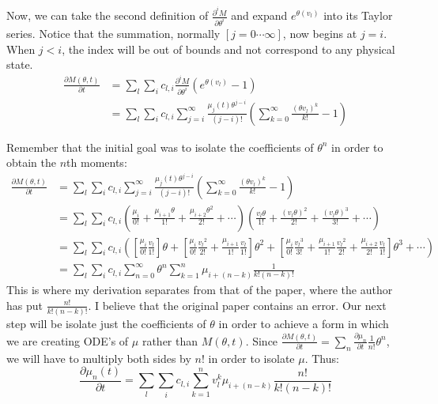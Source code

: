 \documentclass[a4paper,10pt]{article}
\begin{document}
Now, we can take the second definition of $\frac{\partial ^i M}{\partial \theta^i}$ and expand $e^{\theta (v_l)}$ into its Taylor series. Notice that the summation, normally $\left[j=0\cdots \infty\right]$, now begins at $j=i$. When $j<i$, the index will be out of bounds and not correspond to any physical state.
\begin{align*}
 \frac{\partial M(\theta, t)}{\partial t} &= \sum_l \sum_i c_{l,i} \frac{\partial ^i M}{\partial \theta^i} \left(e^{\theta (v_l)}-1\right)\\
 &= \sum_l \sum_i c_{l,i} \sum_{j=i}^\infty \frac{\mu_j(t)\theta^{j-i}}{(j-i)!}\left(\sum_{k=0}^\infty \frac{{(\theta v_l)}^k}{k!}-1\right)
\end{align*}

Remember that the initial goal was to isolate the coefficients of $\theta^n$ in order to obtain the $n$th moments:
\begin{align*}
 \frac{\partial M(\theta, t)}{\partial t} &= \sum_l \sum_i c_{l,i} \sum_{j=i}^\infty \frac{\mu_j(t)\theta^{j-i}}{(j-i)!} \left( \sum_{k=0}^\infty \frac{{(\theta v_l)}^k}{k!}-1 \right)\\
&= \sum_l \sum_i c_{l,i} \left( \frac{\mu_i}{0!}+\frac{\mu_{i+1}\theta}{1!}+\frac{\mu_{i+2}\theta^2}{2!}+\cdots \right) \left(\frac{v_l \theta}{1!}+\frac{{(v_l \theta)}^2}{2!}+\frac{{(v_l \theta)}^3}{3!}+\cdots\right)\\
 &= \sum_l \sum_i c_{l,i} \left( \left[\frac{\mu_i}{0!}\frac{v_l}{1!}\right]\theta+\left[\frac{\mu_{i}}{0!}\frac{{v_l}^2}{2!}+\frac{\mu_{i+1}}{1!}\frac{{v_l}}{1!}\right]\theta^2+\left[\frac{\mu_{i}}{0!}\frac{{v_l}^3}{3!}+\frac{\mu_{i+1}}{1!}\frac{{v_l}^2}{2!}+\frac{\mu_{i+2}}{2!}\frac{{v_l}}{1!}\right]\theta^3+\cdots\right)\\
  &=\sum_l \sum_i c_{l,i} \sum_{n=0}^\infty \theta^n \sum_{k=1}^n \mu_{i+(n-k)} \frac{1}{k!(n-k)!}
\end{align*}
This is where my derivation separates from that of the paper, where the author has put $\frac{n!}{k!(n-k)!}$. I believe that the original paper contains an error. Our next step will be isolate just the coefficients of $\theta$ in order to achieve a form in which we are creating ODE's of $\mu$ rather than $M(\theta, t)$. Since $\frac{\partial M(\theta, t)}{\partial t}=\sum_n \frac{\partial \mu_n}{\partial t}\frac{1}{n!}\theta^n$, 
 we will have to multiply both sides by $n!$ in order to isolate $\mu$. Thus:
  $$ \frac{\partial \mu_n(t)}{\partial t}=\sum_l \sum_i c_{l,i} \sum_{k=1}^n v_l^k \mu_{i+(n-k)} \frac{n!}{k!(n-k)!}$$
\end{document}
